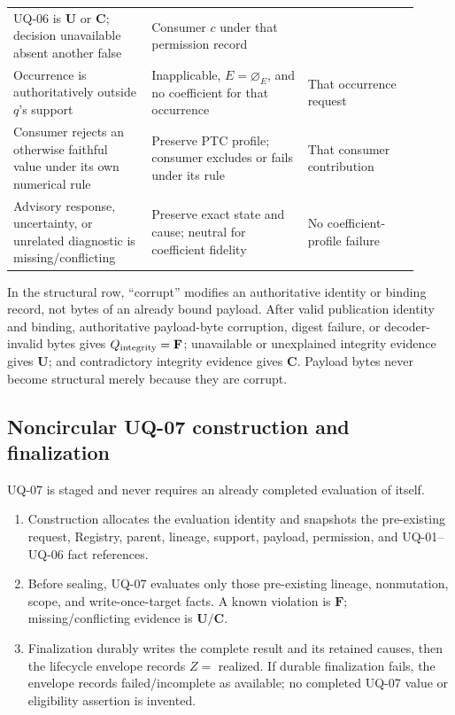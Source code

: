 \begin{longtable}{p{0.31\linewidth}p{0.35\linewidth}p{0.25\linewidth}}
UQ-06 is \(\mathbf U\) or \(\mathbf C\); decision unavailable absent another
false & Consumer \(c\) under that permission record\\
Occurrence is authoritatively outside \(q\)'s support & Inapplicable,
\(E=\varnothing_E\), and no coefficient for that occurrence & That occurrence
request\\
Consumer rejects an otherwise faithful value under its own numerical rule &
Preserve PTC profile; consumer excludes or fails under its rule & That
consumer contribution\\
Advisory response, uncertainty, or unrelated diagnostic is missing/conflicting
& Preserve exact state and cause; neutral for coefficient fidelity & No
coefficient-profile failure\\
\bottomrule
\end{longtable}

In the structural row, ``corrupt'' modifies an authoritative identity or
binding record, not bytes of an already bound payload. After valid publication
identity and binding, authoritative payload-byte corruption, digest failure,
or decoder-invalid bytes gives \(Q_{\rm integrity}=\mathbf F\); unavailable
or unexplained integrity evidence gives \(\mathbf U\); and contradictory
integrity evidence gives \(\mathbf C\). Payload bytes never become structural
merely because they are corrupt.

\subsection{Noncircular UQ-07 construction and finalization}

UQ-07 is staged and never requires an already completed evaluation of itself.

\begin{enumerate}
\item Construction allocates the evaluation identity and snapshots the
pre-existing request, Registry, parent, lineage, support, payload, permission,
and UQ-01--UQ-06 fact references.
\item Before sealing, UQ-07 evaluates only those pre-existing lineage,
nonmutation, scope, and write-once-target facts. A known violation is
\(\mathbf F\); missing/conflicting evidence is \(\mathbf U/\mathbf C\).
\item Finalization durably writes the complete result and its retained causes,
then the lifecycle envelope records \(Z=\) realized. If durable finalization
fails, the envelope records failed/incomplete as available; no completed
UQ-07 value or eligibility assertion is invented.
\end{enumerate}

